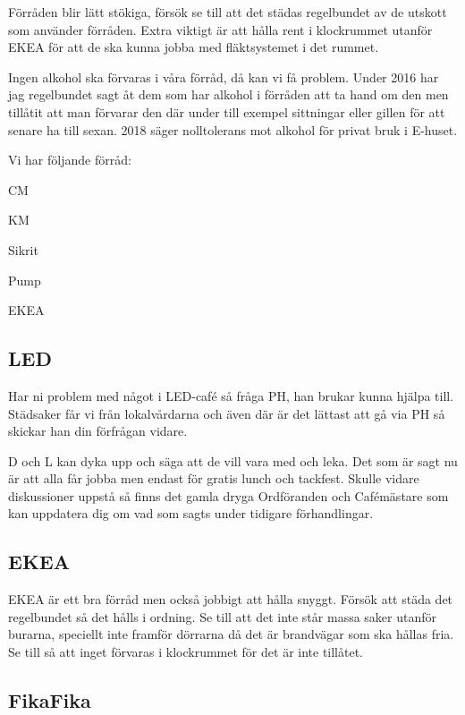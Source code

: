 \documentclass[10pt]{article}
\begin{document}
    Förråden blir lätt stökiga, försök se till att det städas regelbundet av de utskott som använder förråden. Extra viktigt är att hålla rent i klockrummet utanför EKEA för att de ska kunna jobba med fläktsystemet i det rummet.
    
    Ingen alkohol ska förvaras i våra förråd, då kan vi få problem. Under 2016 har jag regelbundet sagt åt dem som har alkohol i förråden att ta hand om den men tillåtit att man förvarar den där under till exempel sittningar eller gillen för att senare ha till sexan. 2018 säger nolltolerans mot alkohol för privat bruk i E-huset.
    
    Vi har följande förråd:
    
    \begin{dashlist}
    \item CM
    \item KM
    \item Sikrit
    \item Pump
    \item EKEA
    \end{dashlist}
    
    \subsection{LED}
    
    Har ni problem med något i LED-café så fråga PH, han brukar kunna hjälpa till. Städsaker får vi från lokalvårdarna och även där är det lättast att gå via PH så skickar han din förfrågan vidare.
    
    D och L kan dyka upp och säga att de vill vara med och leka. Det som är sagt nu är att alla får jobba men endast för gratis lunch och tackfest. Skulle vidare diskussioner uppstå så finns det gamla dryga Ordföranden och Cafémästare som kan uppdatera dig om vad som sagts under tidigare förhandlingar.
    
    \subsection{EKEA}
    
    EKEA är ett bra förråd men också jobbigt att hålla snyggt. Försök att städa det regelbundet så det hålls i ordning. Se till att det inte står massa saker utanför burarna, speciellt inte framför dörrarna då det är brandvägar som ska hållas fria. Se till så att inget förvaras i klockrummet för det är inte tillåtet.
    
    \subsection{FikaFika}
    
\end{document}
